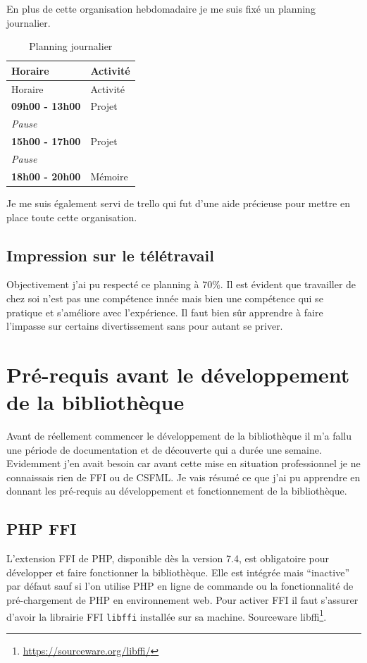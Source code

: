 \documentclass[11pt,a4paper,krantz2,11pt,oneside]{krantz}
\renewcommand{\href}[2]{#2\footnote{\url{#1}}}
\begin{document}
En plus de cette organisation hebdomadaire je me suis fixé un planning journalier.

\begin{longtable}[]{@{}ll@{}}
\caption{\label{tab:planning} Planning journalier}\tabularnewline
\toprule
Horaire & Activité\tabularnewline
\midrule
\endfirsthead
\toprule
Horaire & Activité\tabularnewline
\midrule
\endhead
\textbf{09h00 - 13h00} & Projet\tabularnewline
\emph{Pause} &\tabularnewline
\textbf{15h00 - 17h00} & Projet\tabularnewline
\emph{Pause} &\tabularnewline
\textbf{18h00 - 20h00} & Mémoire\tabularnewline
\bottomrule
\end{longtable}

Je me suis également servi de trello qui fut d'une aide précieuse pour mettre en place toute cette organisation.

\hypertarget{impression-sur-le-tuxe9luxe9travail}{%
\subsection{Impression sur le télétravail}\label{impression-sur-le-tuxe9luxe9travail}}

Objectivement j'ai pu respecté ce planning à 70\%. Il est évident que travailler de chez soi n'est pas une compétence innée mais bien une compétence qui se pratique et s'améliore avec l'expérience. Il faut bien sûr apprendre à faire l'impasse sur certains divertissement sans pour autant se priver.

\hypertarget{pre-requis}{%
\section{Pré-requis avant le développement de la bibliothèque}\label{pre-requis}}

Avant de réellement commencer le développement de la bibliothèque il m'a fallu une période de documentation et de découverte qui a durée une semaine. Evidemment j'en avait besoin car avant cette mise en situation professionnel je ne connaissais rien de FFI ou de CSFML. Je vais résumé ce que j'ai pu apprendre en donnant les pré-requis au développement et fonctionnement de la bibliothèque.

\hypertarget{php-ffi}{%
\subsection{PHP FFI}\label{php-ffi}}

L'extension FFI de PHP, disponible dès la version 7.4, est obligatoire pour développer et faire fonctionner la bibliothèque. Elle est intégrée mais ``inactive'' par défaut \citep{the_php_group_ffi_2019} sauf si l'on utilise PHP en ligne de commande ou la fonctionnalité de pré-chargement de PHP en environnement web. Pour activer FFI il faut s'assurer d'avoir la librairie FFI \texttt{libffi} installée sur sa machine. \href{https://sourceware.org/libffi/}{Sourceware libffi}.
\end{document}
